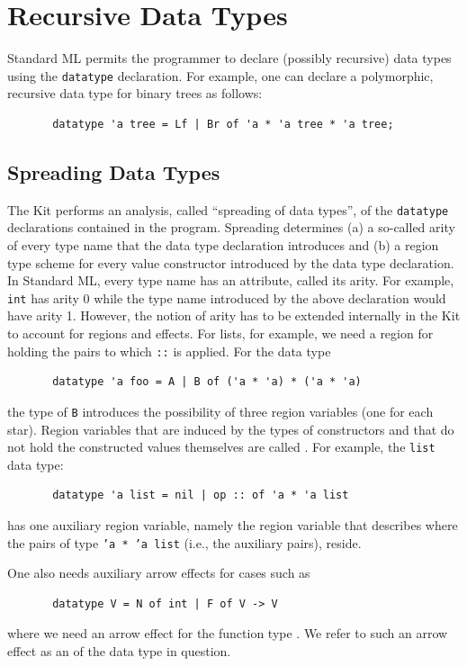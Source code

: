 \documentclass[12pt]{book}
\begin{document}
\chapter{Recursive Data Types}
\label{datatypes.sec}
Standard ML permits the programmer to declare (possibly recursive) data types 
using the {\tt datatype} declaration. For example, one can declare a polymorphic, recursive
data type for binary trees as follows:
\begin{verbatim}
       datatype 'a tree = Lf | Br of 'a * 'a tree * 'a tree;
\end{verbatim}
\section{Spreading Data Types}
The Kit performs an analysis, called ``spreading of data types'',
of the {\tt datatype} declarations contained in the program. Spreading
determines  (a) a so-called arity of every type name
that the data type declaration introduces and (b) a region type scheme for
every value constructor introduced by the data type declaration. In Standard ML,
every type name has an attribute, called its arity. For example, {\tt int} has
arity 0 while the type name introduced by the above declaration would have
arity 1. However, the notion of arity has to be extended internally in the Kit to account for regions
and effects. For lists, for example, we need a region for holding the pairs to which {\tt ::} is
applied. For the data type
\begin{verbatim}
       datatype 'a foo = A | B of ('a * 'a) * ('a * 'a)
\end{verbatim}
the type of {\tt B} introduces the possibility of three region variables
(one for each star). Region variables that are induced by the types
of constructors and that do not hold the constructed values themselves are called
. For example,
the {\tt list} data type:
\begin{verbatim}
       datatype 'a list = nil | op :: of 'a * 'a list
\end{verbatim}
has one auxiliary region variable, namely the region variable that
describes where the pairs of type {\tt 'a * 'a list} (i.e., the auxiliary
pairs), reside.

One also needs auxiliary arrow effects for cases such as 
\begin{verbatim}
       datatype V = N of int | F of V -> V
\end{verbatim}
where we need an arrow effect for the function type . We refer
to such an arrow effect as an  of the data type in question.
\end{document}
